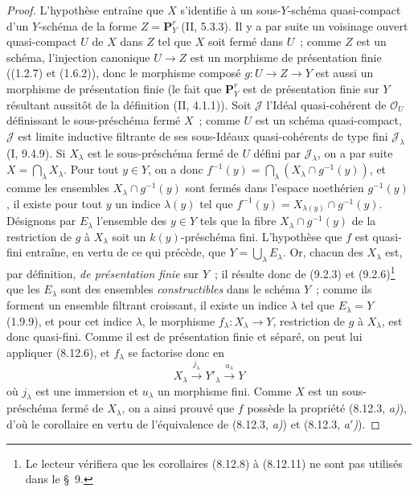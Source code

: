 \begin{proof}
L'hypothèse entraîne que $X$ s'identifie à un sous-$Y$-schéma quasi-compact
d'un $Y$-schéma de la forme $Z=\mathbf P_Y^r$ (II, 5.3.3). Il y a par suite
un voisinage ouvert quasi-compact $U$ de $X$ dans $Z$ tel que $X$ soit fermé
dans $U$~; comme $Z$ est un schéma, l'injection canonique $U\to Z$ est un
morphisme de présentation finie ((1.2.7) et (1.6.2)), donc le morphisme
composé $g:U\to Z\to Y$ est aussi un morphisme de présentation finie (le
fait que $\mathbf P_Y^r$ est de présentation finie sur $Y$ résultant
aussitôt de la définition (II, 4.1.1)). Soit $\mathcal J$ l'Idéal
quasi-cohérent de $\mathcal O_U$ définissant le sous-préschéma fermé $X$~;
comme $U$ est un schéma quasi-compact, $\mathcal J$ est limite inductive
filtrante de ses sous-Idéaux quasi-cohérents de type fini $\mathcal J_\lambda$
(I, 9.4.9). Si $X_\lambda$ est le sous-préschéma fermé de $U$ défini par
$\mathcal J_\lambda$, on a par suite $X=\bigcap_\lambda X_\lambda$. Pour tout
$y\in Y$, on a donc
$f^{-1}(y)=\bigcap_\lambda(X_\lambda\cap g^{-1}(y))$, et comme les ensembles
$X_\lambda\cap g^{-1}(y)$ sont fermés dans l'espace noethérien
$g^{-1}(y)$, il existe pour tout $y$ un indice $\lambda(y)$ tel que
$f^{-1}(y)=X_{\lambda(y)}\cap g^{-1}(y)$. Désignons par $E_\lambda$
l'ensemble des $y\in Y$ tels que la fibre $X_\lambda\cap g^{-1}(y)$ de la
restriction de $g$ à $X_\lambda$ soit un $k(y)$-préschéma fini. L'hypothèse
que $f$ est quasi-fini entraîne, en vertu de ce qui précède, que
$Y=\bigcup_\lambda E_\lambda$. Or, chacun des $X_\lambda$ est, par
définition, \emph{de présentation finie} sur $Y$~; il résulte donc de
(9.2.3) et (9.2.6)\footnote{Le lecteur vérifiera que les corollaires (8.12.8)
à (8.12.11) ne sont pas utilisés dans le \S~9.} que les $E_\lambda$ sont des
ensembles \emph{constructibles} dans le schéma $Y$~; comme ils forment un
ensemble filtrant croissant, il existe un indice $\lambda$ tel que
$E_\lambda=Y$ (1.9.9), et pour cet indice $\lambda$, le morphisme
$f_\lambda:X_\lambda\to Y$, restriction de $g$ à $X_\lambda$, est donc
quasi-fini. Comme il est de présentation finie et séparé, on peut lui
appliquer (8.12.6), et $f_\lambda$ se factorise donc en
\[
X_\lambda\xrightarrow{j_\lambda}Y'_\lambda
\xrightarrow{u_\lambda}Y
\]
où $j_\lambda$ est une immersion et $u_\lambda$ un morphisme fini. Comme
$X$ est un sous-préschéma fermé de $X_\lambda$, on a ainsi prouvé que $f$
possède la propriété (8.12.3, \emph{a)}), d'où le corollaire en vertu de
l'équivalence de (8.12.3, \emph{a)}) et (8.12.3, \emph{a$'$)}).
\end{proof}


